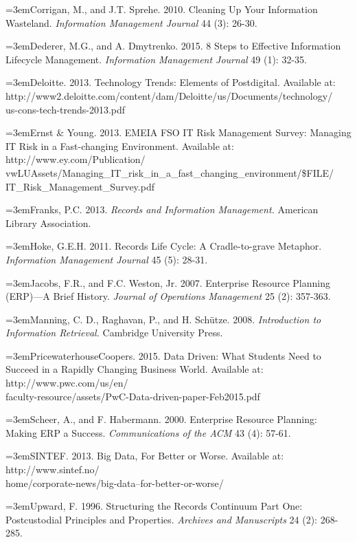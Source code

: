 \documentclass[12pt]{article}
\newcommand{\Reference}[1]{\parindent=0pt\hangindent=3em\hangafter=1#1\vspace{.15in}}
\begin{document}
\Reference{Corrigan, M., and J.T. Sprehe. 2010. Cleaning Up Your Information Wasteland. \emph{Information Management Journal} 44 (3): 26-30.}

\Reference{Dederer, M.G., and A. Dmytrenko. 2015. 8 Steps to Effective Information Lifecycle Management. \emph{Information Management Journal} 49 (1): 32-35.}

\Reference{Deloitte. 2013. Technology Trends: Elements of Postdigital. Available at:\\http://www2.deloitte.com/content/dam/Deloitte/us/Documents/technology/\\us-cons-tech-trends-2013.pdf}

\Reference{Ernst \& Young. 2013. EMEIA FSO IT Risk Management Survey: Managing IT Risk in a Fast-changing Environment. Available at: http://www.ey.com/Publication/\\vwLUAssets/Managing\_IT\_risk\_in\_a\_fast\_changing\_environment/\$FILE/\\IT\_Risk\_Management\_Survey.pdf}

\Reference{Franks, P.C. 2013. \emph{Records and Information Management.} American Library Association.}

\Reference{Hoke, G.E.H. 2011. Records Life Cycle: A Cradle-to-grave Metaphor. \emph{Information Management Journal} 45 (5): 28-31.}

\Reference{Jacobs, F.R., and F.C. Weston, Jr. 2007. Enterprise Resource Planning (ERP)---A Brief History. \emph{Journal of Operations Management} 25 (2): 357-363.}

\Reference{Manning, C. D., Raghavan, P., and H. Sch\"utze. 2008. \emph{Introduction to Information Retrieval.} Cambridge University Press.}

\Reference{PricewaterhouseCoopers. 2015. Data Driven: What Students Need to Succeed in a Rapidly Changing Business World. Available at: http://www.pwc.com/us/en/\\faculty-resource/assets/PwC-Data-driven-paper-Feb2015.pdf}

\Reference{Scheer, A., and F. Habermann. 2000. Enterprise Resource Planning: Making ERP a Success. \emph{Communications of the ACM} 43 (4): 57-61.}

\Reference{SINTEF. 2013. Big Data, For Better or Worse. Available at: http://www.sintef.no/\\home/corporate-news/big-data--for-better-or-worse/}

\Reference{Upward, F. 1996. Structuring the Records Continuum Part One: Postcustodial Principles and Properties. \emph{Archives and Manuscripts} 24 (2): 268-285.}
\end{document}

